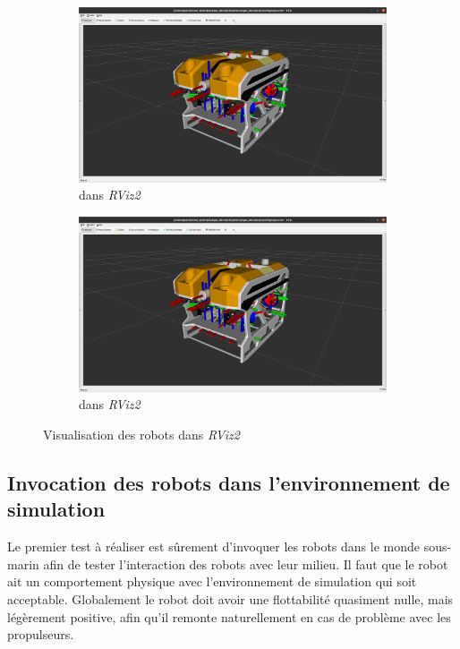 			\begin{figure}
				\centering
				\begin{subfigure}[t]{0.45\textwidth}
					\centering
					\includegraphics[width=\textwidth]{imgs/argos_rviz.png}
					\caption{\argos{} dans \textit{RViz2}}
					\label{fig:argos_rviz}
				\end{subfigure}
				\begin{subfigure}[t]{0.45\textwidth}
					\centering
					\includegraphics[width=\textwidth]{imgs/argos_rviz.png}
					\caption{\atoll{} dans \textit{RViz2}}
					\label{fig:atoll_rviz}
				\end{subfigure}
				\caption{Visualisation des robots dans \textit{RViz2}}
				\label{fig:rviz2_robots}
			\end{figure}

		\subsection{Invocation des robots dans l'environnement de simulation}

			Le premier test à réaliser est sûrement d'invoquer les robots dans le monde sous-marin afin de tester l'interaction des robots avec leur milieu. Il faut que le robot ait un comportement physique avec l'environnement de simulation qui soit acceptable. Globalement le robot doit avoir une flottabilité quasiment nulle, mais légèrement positive, afin qu'il remonte naturellement en cas de problème avec les propulseurs.

